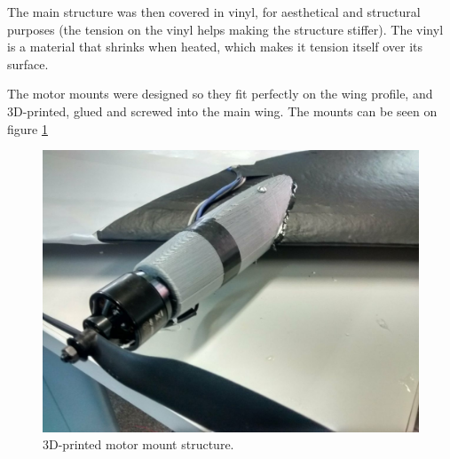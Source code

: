 The main structure was then covered in vinyl, for aesthetical and structural purposes (the tension on the vinyl helps making the structure stiffer). The vinyl is a material that shrinks when heated, which makes it tension itself over its surface.

The motor mounts were designed so they fit perfectly on the wing profile, and 3D-printed, glued and screwed into the main wing.
The mounts can be seen on figure \ref{fig:motormount}


\begin{figure}[H]
\centering
  \includegraphics[width=\linewidth]{figs/3dprintedmount.png}
  \caption{3D-printed motor mount structure.}
  \label{fig:motormount}
\end{figure}
	
	
	

